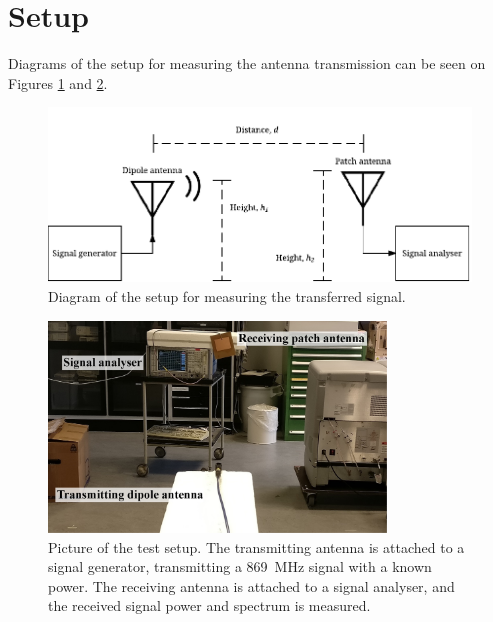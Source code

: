 \section*{Setup}
Diagrams of the setup for measuring the antenna transmission can be seen on Figures \ref{Appendix:fig:antennaTransSetup} and \ref{Appendix:fig:antennaTransPicture}.
\begin{figure} [!h]
    \centering
        \includegraphics[width=\textwidth]{figures/test/antennaTransmission}
        \caption{Diagram of the setup for measuring the transferred signal.}
        \label{Appendix:fig:antennaTransSetup}
\end{figure}

\begin{figure} [!h]
    \centering
        \includegraphics[width=0.8\textwidth]{figures/test/antennaTransmissionPic}
        \caption{Picture of the test setup. The transmitting antenna is attached to a signal generator, transmitting a \SI{869}{\mega\hertz} signal with a known power. The receiving antenna is attached to a signal analyser, and the received signal power and spectrum is measured.}
        \label{Appendix:fig:antennaTransPicture}
\end{figure}

